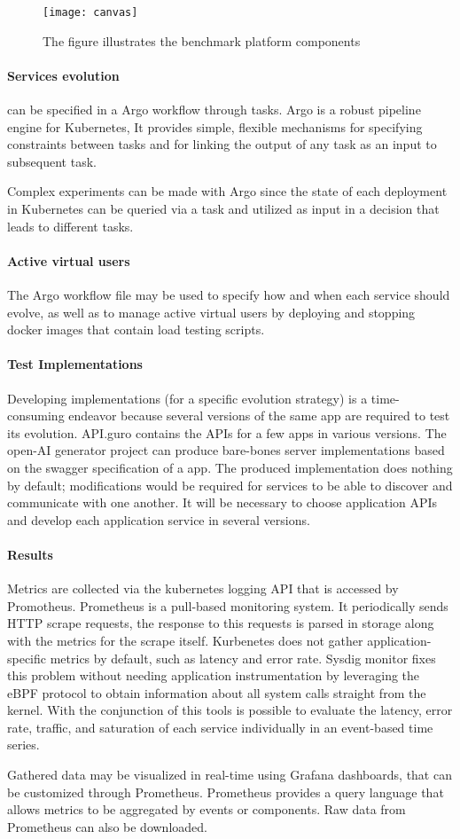 \begin{figure}[htbp]
    \centering
    \texttt{[image: canvas]}
    \caption{The figure illustrates the benchmark platform components}
    \label{fig:canvas}
\end{figure}

\paragraph{Services evolution} can be specified in a Argo workflow through tasks.
Argo is a robust pipeline engine for Kubernetes, It provides simple, flexible mechanisms for specifying constraints between tasks and for linking the output of any task as an input to subsequent task.

Complex experiments can be made with Argo since the state of each deployment in Kubernetes can be queried via a task and utilized as input in a decision that leads to different tasks.

\paragraph{Active virtual users} The Argo workflow file may be used to specify how and when each service should evolve, as well as to manage active virtual users by deploying and stopping docker images that contain load testing scripts.


\paragraph{Test Implementations}
Developing implementations (for a specific evolution strategy) is a time-consuming endeavor because several versions of the same app are required to test its evolution.
API.guro contains the APIs for a few apps in various versions.
The open-AI generator project can produce bare-bones server implementations based on the swagger specification of a app.
The produced implementation does nothing by default; modifications would be required for services to be able to discover and communicate with one another.
It will be necessary to choose application APIs and develop each application service in several versions.

\paragraph{Results}
Metrics are collected via the kubernetes logging API that is accessed by Promotheus. Prometheus is a pull-based monitoring system. It periodically sends HTTP scrape requests, the response to this requests is parsed in storage along with the metrics for the scrape itself.
Kurbenetes does not gather application-specific metrics by default, such as latency and error rate. Sysdig monitor fixes this problem without needing application instrumentation by leveraging the eBPF protocol to obtain information about all system calls straight from the kernel.
With the conjunction of this tools is possible to evaluate the latency, error rate, traffic, and saturation of each service individually in an event-based time series.

Gathered data may be visualized in real-time using Grafana dashboards, that can be customized through Prometheus.
Prometheus provides a query language that allows metrics to be aggregated by events or components.
Raw data from Prometheus can also be downloaded.